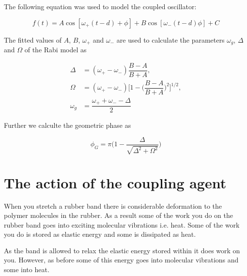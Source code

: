 The following equation was used to model the coupled oscillator:

\begin{equation}
	f (t) = A \cos [ \omega_{+} (t - d) + \phi ] + B \cos [ \omega_{-} (t-d) \phi ] +C
\end{equation}

The fitted values of $ A $, $ B $, $ \omega_{+} $ and $ \omega_{-} $ are used to calculate the parameters $ \omega_g $, $ \Delta $ and $ \Omega $ of the Rabi model as

\begin{equation}
	\begin{split}
		\Delta &= (\omega_{+} - \omega_{-}) \dfrac{B-A}{B+A}, \\
		\Omega &= (\omega_{+} - \omega_{-}) \Bigg[ 1 - \Bigg(  \dfrac{B-A}{B+A} \Bigg)^2  \Bigg]^{1/2}, \\
		\omega_g &= \dfrac{\omega_{+} + \omega_{-} - \Delta}{2}
	\end{split}
\end{equation}

Further we calculte the geometric phase as

\begin{equation}
	\phi_G = \pi \Bigg( 1 - \dfrac{\Delta}{\sqrt{\Delta^2 + \Omega^2 }} \Bigg)
\end{equation}

\section{The action of the coupling agent}
When you stretch a rubber band there is considerable deformation to the polymer molecules in the rubber. As a result some of the work you do on the rubber band goes into exciting molecular vibrations i.e. heat. Some of the work you do is stored as elastic energy and some is dissipated as heat.

As the band is allowed to relax the elastic energy stored within it does work on you. However, as before some of this energy goes into molecular vibrations and some into heat.

